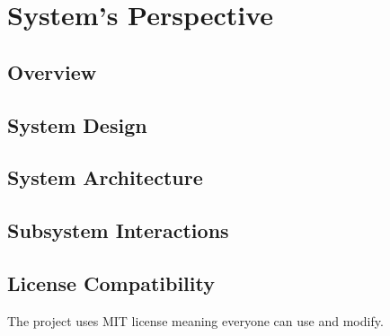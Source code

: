 \section{System's Perspective}
\label{sec:systems_perspective}

\subsection{Overview}
\label{subsec:systems_perspective_overview}

\subsection{System Design}
\label{subsec:systems_perspective_overview}

\subsection{System Architecture}
\label{subsec:systems_perspective_overview}

\subsection{Subsystem Interactions}
\label{subsec:subsystem_interactions}


\subsection{License Compatibility}
\label{subsec:license_compatability}
The project uses MIT license meaning everyone can use and modify.

